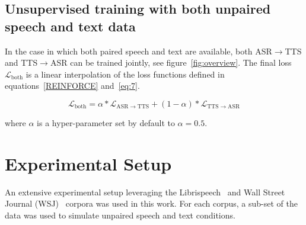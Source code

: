 \documentclass[a4paper]{article}
\begin{document}
\subsection{Unsupervised training with both unpaired speech and text data}
In the case in which both paired speech and text are available, both ASR$\rightarrow$TTS and TTS$\rightarrow$ASR can be trained jointly, see figure~\ref{fig:overview}. The final loss $\mathcal{L}_{\mathrm{both}}$ is a linear interpolation of the loss functions defined in equations~\eqref{REINFORCE} and~\eqref{eq:7}. 

\begin{equation}
\mathcal{L}_{\mathrm{both}} = \alpha * \mathcal{L}_{\mathrm{ASR}\rightarrow\mathrm{TTS}} + (1 - \alpha) * \mathcal{L}_{\mathrm{TTS}\rightarrow\mathrm{ASR}}
\end{equation}

\noindent where $\alpha$ is a hyper-parameter set by default to $\alpha=0.5$.
\section{Experimental Setup}\label{sec:3}
An extensive experimental setup leveraging the Librispeech~\cite{panayotov2015librispeech} and Wall Street Journal (WSJ)~\cite{paul1992design} corpora was used in this work. For each corpus, a sub-set of the data was used to simulate unpaired speech and text conditions.
\end{document}
